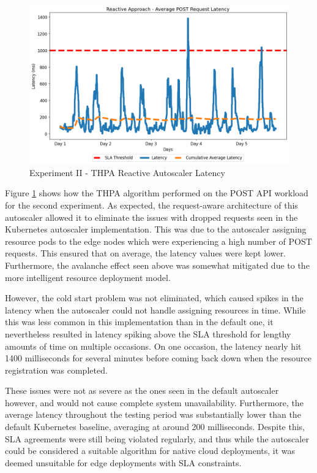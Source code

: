 \begin{figure}[htb]
    \centering
    \caption{Experiment II - THPA Reactive Autoscaler Latency}
    \label{fig:exp2-reactive-k8s}
    \includegraphics[width=0.6\linewidth]{Figures/Compose-Post-Reactive-Latency.png}
\end{figure}

Figure \ref{fig:exp2-reactive-k8s} shows how the THPA algorithm performed on the POST API workload for the second experiment. As expected, the request-aware architecture of this autoscaler allowed it to eliminate the issues with dropped requests seen in the Kubernetes autoscaler implementation. This was due to the autoscaler assigning resource pods to the edge nodes which were experiencing a high number of POST requests. This ensured that on average, the latency values were kept lower. Furthermore, the avalanche effect seen above was somewhat mitigated due to the more intelligent resource deployment model.\par

However, the cold start problem was not eliminated, which caused spikes in the latency when the autoscaler could not handle assigning resources in time. While this was less common in this implementation than in the default one, it nevertheless resulted in latency spiking above the SLA threshold for lengthy amounts of time on multiple occasions. On one occasion, the latency nearly hit 1400 milliseconds for several minutes before coming back down when the resource registration was completed.\par

These issues were not as severe as the ones seen in the default autoscaler however, and would not cause complete system unavailability. Furthermore, the average latency throughout the testing period was substantially lower than the default Kubernetes baseline, averaging at around 200 milliseconds. Despite this, SLA agreements were still being violated regularly, and thus while the autoscaler could be considered a suitable algorithm for native cloud deployments, it was deemed unsuitable for edge deployments with SLA constraints.\par

